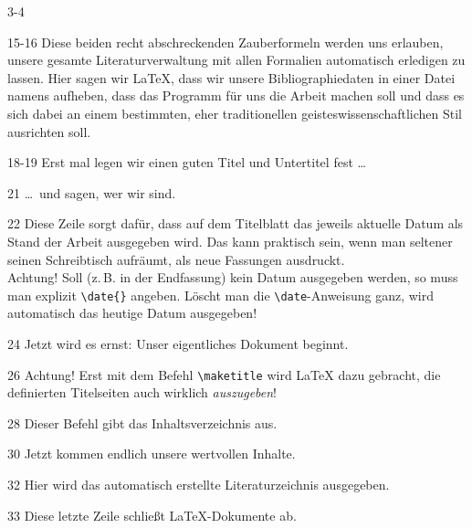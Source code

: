 \begin{labeling}{3-4}
 \item[15-16] Diese beiden recht abschreckenden Zauberformeln werden uns
   erlauben, unsere gesamte Literaturverwaltung mit allen Formalien
   automatisch erledigen zu lassen.  Hier sagen wir \LaTeX{}, dass wir
   unsere Bibliographiedaten in einer Datei namens
    aufheben, dass das Programm
    für uns die Arbeit machen soll und dass es sich dabei
   an einem bestimmten, eher traditionellen geisteswissenschaftlichen Stil
   ausrichten soll.

 \item[18-19] Erst mal legen wir einen guten Titel und Untertitel fest \dots

 \item[21] \dots\ und sagen, wer wir sind.
 
 \item[22] Diese Zeile sorgt dafür, dass auf dem Titelblatt das jeweils
   aktuelle Datum als Stand der Arbeit ausgegeben wird. Das kann praktisch
   sein, wenn man seltener seinen Schreibtisch aufräumt, als neue Fassungen
   ausdruckt.\\ Achtung! Soll (z.\,B. in der Endfassung) kein Datum
   ausgegeben werden, so muss man explizit \lstinline/\date{}/ angeben.
   Löscht man die \lstinline/\date/-Anweisung ganz, wird automatisch das
   heutige Datum ausgegeben!

 \item[24] Jetzt wird es ernst: Unser eigentliches Dokument beginnt.
 
 \item[26] Achtung! Erst mit dem Befehl \lstinline/\maketitle/ wird \LaTeX{}
   dazu gebracht, die definierten Titelseiten auch wirklich
   \emph{auszugeben}!

 \item[28] Dieser Befehl gibt das Inhaltsverzeichnis aus.

 \item[30] Jetzt kommen endlich unsere wertvollen Inhalte.
 
 \item[32] Hier wird das automatisch erstellte Literaturzeichnis ausgegeben.
 
 \item[33] Diese letzte Zeile schließt \LaTeX{}-Dokumente ab.

 \end{labeling}

